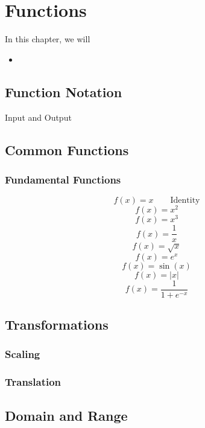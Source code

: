 
\chapter{Functions}

\begin{summary}
In this chapter, we will 
\begin{itemize}
    \item 
\end{itemize}
\end{summary}

\newpage 

\section{Function Notation}

Input and Output

\newpage 
\section{Common Functions}

\subsection*{Fundamental Functions} 
\[ f(x)=x  \quad\quad \text{Identity} \]
\[ f(x)=x^2 \]
\[ f(x)=x^3 \]
\[ f(x)=\frac{1}{x} \]
\[ f(x)=\sqrt{x} \]
\[ f(x)=e^{x} \]
\[ f(x)=\sin(x) \]
\[ f(x)=|x| \]
\[ f(x)=\frac{1}{1+e^{-x}} \]


\newpage 
\section{Transformations}

    \subsection{Scaling}
    \subsection{Translation}

\section{Domain and Range}

